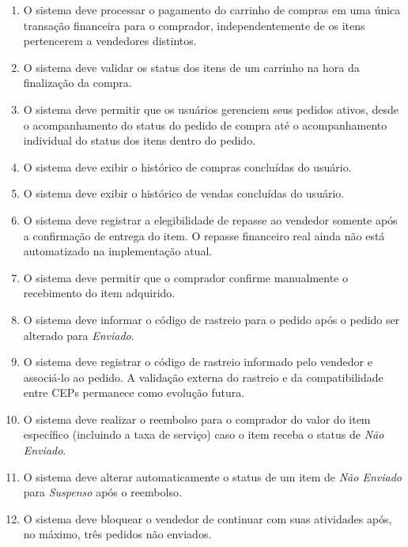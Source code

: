 \documentclass[
	article,			%
	11pt,				%
	oneside,			%
	a4paper,			%
	english,			%
	brazil,				%
	sumario=tradicional
	]{abntex2}
\begin{document}
\begin{enumerate}[label=RF\arabic*:]
    \item O sistema deve processar o pagamento do carrinho de compras em uma única transação financeira para o comprador, independentemente de os itens pertencerem a vendedores distintos.

    \item O sistema deve validar os status dos itens de um carrinho na hora da finalização da compra.

    \item O sistema deve permitir que os usuários gerenciem seus pedidos ativos, desde o acompanhamento do status do pedido de compra até o acompanhamento individual do status dos itens dentro do pedido.

    \item O sistema deve exibir o histórico de compras concluídas do usuário.

    \item O sistema deve exibir o histórico de vendas concluídas do usuário.

    \item O sistema deve registrar a elegibilidade de repasse ao vendedor somente após a confirmação de entrega do item. O repasse financeiro real ainda não está automatizado na implementação atual.

    \item O sistema deve permitir que o comprador confirme manualmente o recebimento do item adquirido. 

    \item O sistema deve informar o código de rastreio para o pedido após o pedido ser alterado para \textit{Enviado}.

    \item O sistema deve registrar o código de rastreio informado pelo vendedor e associá-lo ao pedido. A validação externa do rastreio e da compatibilidade entre CEPs permanece como evolução futura.

    \item O sistema deve realizar o reembolso para o comprador do valor do item específico  (incluindo a taxa de serviço) caso o item receba o status de \textit{Não Enviado}. 

    \item O sistema deve alterar automaticamente o status de um item de \textit{Não Enviado} para \textit{Suspenso} após o reembolso.

    \item O sistema deve bloquear o vendedor de continuar com suas atividades após, no máximo, três pedidos não enviados.


\end{enumerate}
\end{document}

